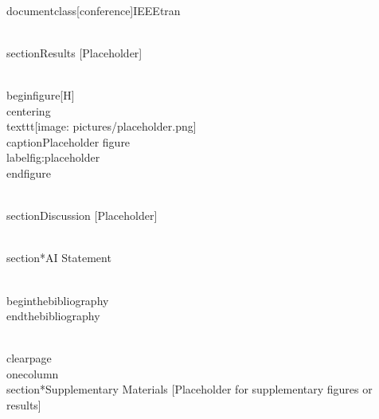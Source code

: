 \\documentclass[conference]{IEEEtran}
\begin{document}
\\section{Results}
[Placeholder]

\\begin{figure}[H]
    \\centering
    \\texttt{[image: pictures/placeholder.png]}
    \\caption{Placeholder figure}
    \\label{fig:placeholder}
\\end{figure}

\\section{Discussion}
[Placeholder]

\\section*{AI Statement}


\\begin{thebibliography}{9}
\\end{thebibliography}

\\clearpage
\\onecolumn
\\section*{Supplementary Materials}
[Placeholder for supplementary figures or results]

\
\end{document}
